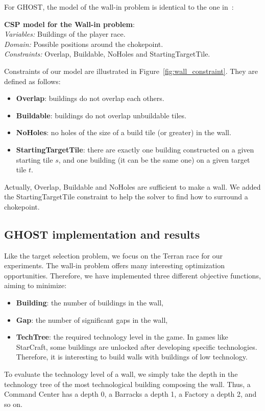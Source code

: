 \documentclass[journal]{IEEEtran}
\newcommand{\ghost}{\textsc{GHOST}\xspace}
\newcommand{\modelcsp}[4]%
{ \begin{trivlist}
  \item[]%
    \textbf{CSP model for #1}:\\
    \textit{Variables:} #2\\
    \textit{Domain:} #3\\
    \textit{Constraints:} #4
  \end{trivlist}%
}
\begin{document}
For \ghost, the  model of the wall-in problem is  identical to the one
in~\cite{RichouxUO14}:
\modelcsp{the Wall-in problem}%
{Buildings of the player race.}%
{Possible positions around the chokepoint.}%
{Overlap, Buildable, NoHoles and StartingTargetTile.}

Constraints     of      our     model     are      illustrated     in
Figure~\ref{fig:wall_constraint}. They are defined as follows:
\begin{itemize}
\item {\bf Overlap}: buildings do not overlap each others.
\item {\bf Buildable}: buildings do not overlap unbuildable tiles.
\item {\bf NoHoles}: no holes of the size of a build tile (or greater)
  in the wall.
\item  {\bf  StartingTargetTile}:  there   are  exactly  one  building
  constructed on a  given starting tile $s$, and one  building (it can
  be the same one) on a given target tile $t$.
\end{itemize}

Actually,  Overlap, Buildable  and NoHoles  are sufficient  to make  a
wall. We added the StartingTargetTile constraint to help the solver to
find how to surround a chokepoint.

\subsection{\ghost implementation and results}

Like the  target selection problem, we focus on  the Terran race
for our experiments.    The  wall-in  problem  offers   many  interesting
optimization  opportunities.   Therefore,  we have  implemented  three
different objective functions, aiming to minimize:
\begin{itemize}
\item {\bf Building}: the number of buildings in the wall,
\item {\bf Gap}: the number of significant gaps in the wall,
\item {\bf  TechTree}: the required  technology level in the  game. In
  games  like  StarCraft,  some buildings are unlocked after developing specific  technologies.
  Therefore,  it is interesting to  build walls
  with buildings of low technology.
\end{itemize}

To evaluate the  technology level of a wall, we  simply take the depth
in the  technology tree of  the most technological  building composing
the wall. Thus, a Command Center has  a depth 0, a Barracks a depth 1,
a Factory a depth 2, and so on.
\end{document}
